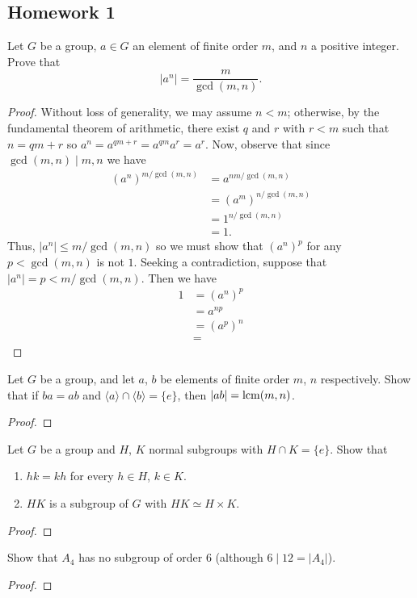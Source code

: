 \newpage

\subsection{Homework 1}
\begin{problem}
  Let $G$ be a group, $a\in G$ an element of finite order $m$, and $n$ a
  positive integer. Prove that
  \[
    |a^n|=\frac{m}{\gcd(m,n)}.
  \]
\end{problem}
\begin{proof}
  Without loss of generality, we may assume $n<m$; otherwise, by the
  fundamental theorem of arithmetic, there exist $q$ and $r$ with $r<m$
  such that $n=qm+r$ so $a^n=a^{qm+r}=a^{qm}a^r=a^r$. Now, observe that
  since $\gcd(m,n)\mid m,n$ we have
  \begin{equation}
    \label{eq:1:1}
    \begin{aligned}
      {(a^n)}^{m/\gcd(m,n)}
      &=a^{nm/\gcd(m,n)}\\
      &=({a^m})^{n/\gcd(m,n)}\\
      &=1^{n/\gcd(m,n)}\\
      &=1.
    \end{aligned}
  \end{equation}
  Thus, $|a^n|\leq m/\gcd(m,n)$ so we must show that $({a^n})^p$ for any
  $p<\gcd(m,n)$ is not $1$. Seeking a contradiction, suppose that
  $|a^n|=p<m/\gcd(m,n)$. Then we have
  \begin{equation}
    \label{eq:1:2}
    \begin{aligned}
      1
      &={(a^n)}^p\\
      &=a^{np}\\
      &={(a^p)}^n\\
      &=
    \end{aligned}
  \end{equation}
\end{proof}

\begin{problem}
  Let $G$ be a group, and let $a$, $b$ be elements of finite order $m$, $n$
  respectively. Show that if $ba=ab$ and
  $\langle a\rangle\cap\langle b\rangle=\{e\}$, then $|ab|=\operatorname{lcm}(m,n)$.
\end{problem}
\begin{proof}
\end{proof}

\begin{problem}
  Let $G$ be a group and $H$, $K$ normal subgroups with $H\cap
  K=\{e\}$. Show that
  \begin{enumerate}[label=(\alph*),noitemsep]
  \item $hk=kh$ for every $h\in H$, $k\in K$.
  \item $HK$ is a subgroup of $G$ with $HK\simeq H\times K$.
  \end{enumerate}
\end{problem}
\begin{proof}
\end{proof}

\begin{problem}
  Show that $A_4$ has no subgroup of order $6$ (although $6\mid 12=|A_4|$).
\end{problem}
\begin{proof}
\end{proof}

